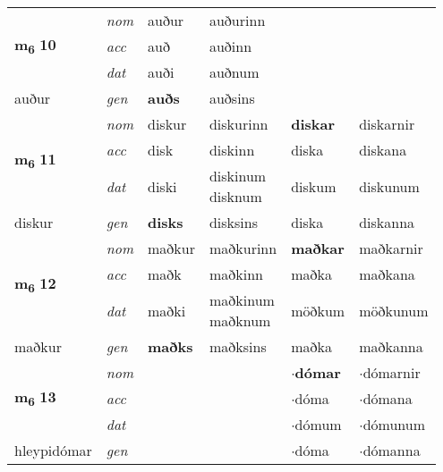 \begin{longtable}[l]{llllll}
\multirow{3}{*}{{{\textbf{m{\textsubscript{6}}} \Large{\textbf{10}}}}}  & {\footnotesize{{\textit{nom}}}} & auður & auðurinn    & \textbf{} &   \\*
 &  {\footnotesize{{\textit{acc}}}} & auð  & auðinn   &   &  \\*
 &  {\footnotesize{{\textit{dat}}}} & auði & auðnum   &  &  \\*
 {\footnotesize{auður}} &   {\footnotesize{{\textit{gen}}}} & \textbf{auðs}  & auðsins  &  &  \\
\cmidrule{1-6}


\multirow{3}{*}{{{\textbf{m{\textsubscript{6}}} \Large{\textbf{11}}}}}  & {\footnotesize{{\textit{nom}}}} & diskur & diskurinn    & \textbf{diskar} & diskarnir  \\*
 &  {\footnotesize{{\textit{acc}}}} & disk  & diskinn   & diska  & diskana \\*
 &  {\footnotesize{{\textit{dat}}}} & diski & \specialcell{diskinum\\ disknum}   & diskum & diskunum \\*
 {\footnotesize{diskur}} &   {\footnotesize{{\textit{gen}}}} & \textbf{disks}  & disksins  & diska & diskanna \\
\cmidrule{1-6}


\multirow{3}{*}{{{\textbf{m{\textsubscript{6}}} \Large{\textbf{12}}}}}  & {\footnotesize{{\textit{nom}}}} & maðkur & maðkurinn    & \textbf{maðkar} & maðkarnir  \\*
 &  {\footnotesize{{\textit{acc}}}} & maðk  & maðkinn   & maðka  & maðkana \\*
 &  {\footnotesize{{\textit{dat}}}} & maðki & \specialcell{maðkinum\\ maðknum}   & möðkum & möðkunum \\*
 {\footnotesize{maðkur}} &   {\footnotesize{{\textit{gen}}}} & \textbf{maðks}  & maðksins  & maðka & maðkanna \\
\cmidrule{1-6}


\multirow{3}{*}{{{\textbf{m{\textsubscript{6}}} \Large{\textbf{13}}}}}  & {\footnotesize{{\textit{nom}}}} &  &     & \textbf{$\cdot$dómar} & $\cdot$dómarnir  \\*
 &  {\footnotesize{{\textit{acc}}}} &   &    & $\cdot$dóma  & $\cdot$dómana \\*
 &  {\footnotesize{{\textit{dat}}}} &  &    & $\cdot$dómum & $\cdot$dómunum \\*
 {\footnotesize{hleypidómar}} &   {\footnotesize{{\textit{gen}}}} & \textbf{}  &   & $\cdot$dóma & $\cdot$dómanna \\
\cmidrule{1-6}



\end{longtable}
